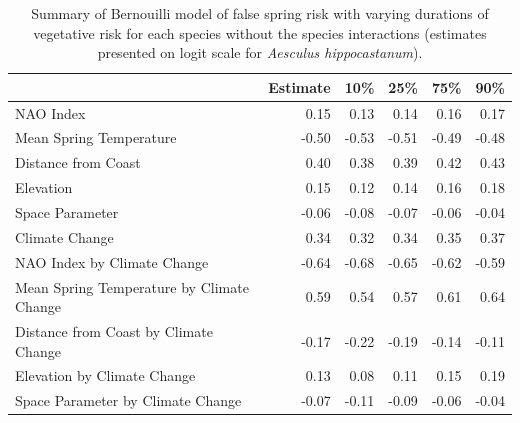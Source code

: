 \documentclass{article}\usepackage[]{graphicx}\usepackage[]{color}
\begin{document}
{%
\begin{table}[H]
\centering
\caption{Summary of Bernouilli model of false spring risk with varying durations of vegetative risk for each species without the species interactions (estimates presented on logit scale for \textit{Aesculus hippocastanum}).} 
\begin{tabular}{lrrrrr}
  \hline
 & Estimate & 10\% & 25\% & 75\% & 90\% \\ 
  \hline
NAO Index & 0.15 & 0.13 & 0.14 & 0.16 & 0.17 \\ 
  Mean Spring 
Temperature & -0.50 & -0.53 & -0.51 & -0.49 & -0.48 \\ 
  Distance from 
Coast & 0.40 & 0.38 & 0.39 & 0.42 & 0.43 \\ 
  Elevation & 0.15 & 0.12 & 0.14 & 0.16 & 0.18 \\ 
  Space Parameter & -0.06 & -0.08 & -0.07 & -0.06 & -0.04 \\ 
  Climate Change & 0.34 & 0.32 & 0.34 & 0.35 & 0.37 \\ 
  NAO Index by Climate Change & -0.64 & -0.68 & -0.65 & -0.62 & -0.59 \\ 
  Mean Spring 
Temperature by Climate Change & 0.59 & 0.54 & 0.57 & 0.61 & 0.64 \\ 
  Distance from 
Coast by Climate Change & -0.17 & -0.22 & -0.19 & -0.14 & -0.11 \\ 
  Elevation by Climate Change & 0.13 & 0.08 & 0.11 & 0.15 & 0.19 \\ 
  Space Parameter by Climate Change & -0.07 & -0.11 & -0.09 & -0.06 & -0.04 \\ 
   \hline
\end{tabular}
\end{table}


}
\end{document}
